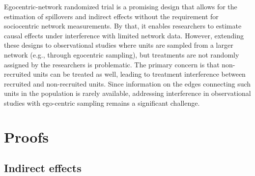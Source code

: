 \documentclass[11pt]{article}
\theoremstyle{definition}
\begin{document}
Egocentric-network randomized trial is a promising design 
that allows for the estimation of spillovers and indirect effects 
without the requirement for sociocentric network measurements. 
By that, it enables researchers to estimate causal effects under interference 
with limited network data.
However, extending these designs to observational studies 
where units are sampled from a larger network (e.g., through egocentric sampling),
but treatments are not randomly assigned by the researchers is problematic.
The primary concern is that non-recruited units 
can be treated as well, leading to treatment interference between
recruited and non-recruited units. Since information on the edges connecting 
such units in the population is rarely available,
 addressing interference in observational studies with
  ego-centric sampling remains a significant challenge.





\newpage

\appendix

\renewcommand{\theequation}{\thesection.\arabic{equation}}

\renewcommand{\theassumption}{\thesection.\arabic{assumption}}

\renewcommand{\theproposition}{\thesection.\arabic{proposition}}

\renewcommand\thefigure{\thesection.\arabic{figure}}    

\renewcommand\thetable{\thesection.\arabic{table}}    



\section{Proofs}
\label{apdx_sec:proof}

\subsection{Indirect effects}
\end{document}
